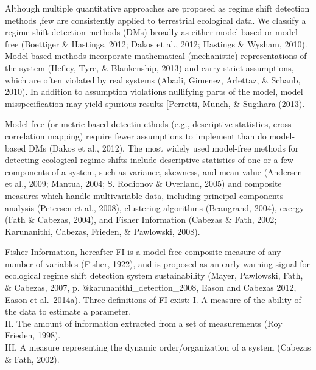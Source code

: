 \documentclass[12pt,twoside,openany]{reedthesis}
\begin{document}
Although multiple quantitative approaches are proposed as regime shift detection methods ,few are consistently applied to terrestrial ecological data. We classify a regime shift detection methods (DMs) broadly as either model-based or model-free (Boettiger \& Hastings, 2012; Dakos et al., 2012; Hastings \& Wysham, 2010). Model-based methods incorporate mathematical (mechanistic) representations of the system (Hefley, Tyre, \& Blankenship, 2013) and carry strict assumptions, which are often violated by real systems (Abadi, Gimenez, Arlettaz, \& Schaub, 2010). In addition to assumption violations nullifying parts of the model, model misspecification may yield spurious results {[}Perretti, Munch, \& Sugihara (2013).

Model-free (or metric-based detectin ethods (e.g., descriptive statistics, cross-correlation mapping) require fewer assumptions to implement than do model-based DMs (Dakos et al., 2012). The most widely used model-free methods for detecting ecological regime shifts include descriptive statistics of one or a few components of a system, such as variance, skewness, and mean value (Andersen et al., 2009; Mantua, 2004; S. Rodionov \& Overland, 2005) and composite measures which handle multivariable data, including principal components analysis (Petersen et al., 2008), clustering algorithms (Beaugrand, 2004), exergy (Fath \& Cabezas, 2004), and Fisher Information (Cabezas \& Fath, 2002; Karunanithi, Cabezas, Frieden, \& Pawlowski, 2008).

Fisher Information, hereafter FI is a model-free composite measure of any number of variables (Fisher, 1922), and is proposed as an early warning signal for ecological regime shift detection system sustainability (Mayer, Pawlowski, Fath, \& Cabezas, 2007, p. @karunanithi\_detection\_2008, Eason and Cabezas 2012, Eason et al.~2014a). Three definitions of FI exist:
I. A measure of the ability of the data to estimate a parameter.\\
II. The amount of information extracted from a set of measurements (Roy Frieden, 1998).\\
III. A measure representing the dynamic order/organization of a system (Cabezas \& Fath, 2002).
\end{document}
